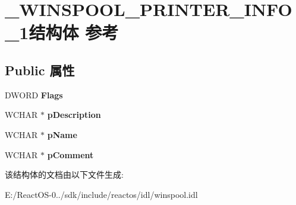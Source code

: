 \hypertarget{struct___w_i_n_s_p_o_o_l___p_r_i_n_t_e_r___i_n_f_o__1}{}\section{\+\_\+\+W\+I\+N\+S\+P\+O\+O\+L\+\_\+\+P\+R\+I\+N\+T\+E\+R\+\_\+\+I\+N\+F\+O\+\_\+1结构体 参考}
\label{struct___w_i_n_s_p_o_o_l___p_r_i_n_t_e_r___i_n_f_o__1}
\subsection*{Public 属性}
\begin{DoxyCompactItemize}
\item 
\mbox{\label{struct___w_i_n_s_p_o_o_l___p_r_i_n_t_e_r___i_n_f_o__1_a99e2d7a61af4993eb6968b5f7b63bdc8}} 
D\+W\+O\+RD {\bfseries Flags}
\item 
\mbox{\label{struct___w_i_n_s_p_o_o_l___p_r_i_n_t_e_r___i_n_f_o__1_a8f6f150c08721cbe34637a071c3867d2}} 
W\+C\+H\+AR $\ast$ {\bfseries p\+Description}
\item 
\mbox{\label{struct___w_i_n_s_p_o_o_l___p_r_i_n_t_e_r___i_n_f_o__1_ac87bbedaee9657f3c5e12ae839993a87}} 
W\+C\+H\+AR $\ast$ {\bfseries p\+Name}
\item 
\mbox{\label{struct___w_i_n_s_p_o_o_l___p_r_i_n_t_e_r___i_n_f_o__1_aa6e59295580868467f0c28de79bf0ff9}} 
W\+C\+H\+AR $\ast$ {\bfseries p\+Comment}
\end{DoxyCompactItemize}


该结构体的文档由以下文件生成\+:\begin{DoxyCompactItemize}
\item 
E\+:/\+React\+O\+S-\/0../sdk/include/reactos/idl/winspool.\+idl\end{DoxyCompactItemize}
